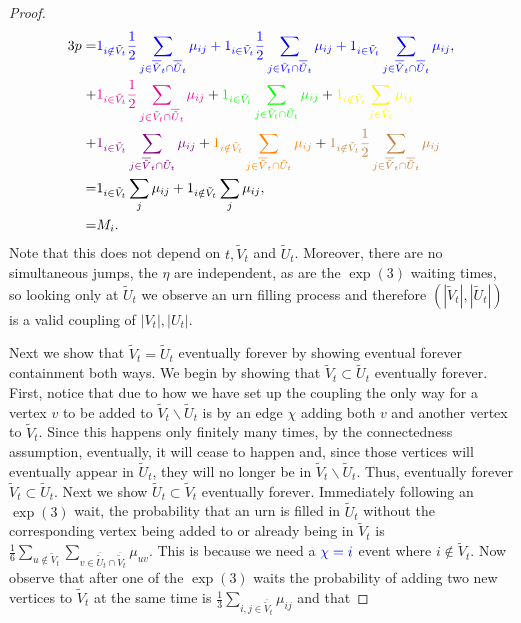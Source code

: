 \documentclass[12pt]{article}
\theoremstyle{definition}
\begin{document}
\begin{proof}
\begin{align*}
    3p = &\textcolor{blue}{1_{i \notin \tilde{V}_t}\frac{1}{2}\sum_{j \in \overline{\tilde{V}}_t \cap \overline{\tilde{U}}_t}\mu_{ij}+1_{i \in \tilde{V}_t}\frac{1}{2}\sum_{j \in \tilde{V}_t \cap \overline{\tilde{U}}_t}\mu_{ij}+1_{i \in \tilde{V}_t}\sum_{j \in \overline{\tilde{V}}_t \cap \overline{\tilde{U}}_t}\mu_{ij}}, \\
    +&\textcolor{magenta}{1_{i \in \tilde{V}_t}\frac{1}{2}\sum_{j \in \tilde{V}_t \cap \overline{\tilde{U}}_t}\mu_{ij}} + \textcolor{green}{1_{i \in \tilde{V}_t}\sum_{j \in \tilde{V}_t \cap \tilde{U}_t}\mu_{ij}}+\textcolor{yellow}{1_{i\notin \tilde{V}_t}\sum_{j \in \tilde{V}_t}\mu_{ij}}\\
    +&\textcolor{violet}{1_{i \in \tilde{V}_t} \sum_{j \in \overline{\tilde{V}}_t \cap \tilde{U}_t}\mu_{ij}} + \textcolor{orange}{1_{i \notin \tilde{V}_t}\sum_{j \in \overline{\tilde{V}}_t \cap \tilde{U}_t}\mu_{ij}}
    +\textcolor{brown}{1_{i \notin \tilde{V}_t}\frac{1}{2}\sum_{j \in \overline{\tilde{V}}_t \cap \overline{\tilde{U}}_t}\mu_{ij}} \\
    = &1_{i \in \tilde{V}_t}\sum_{j}\mu_{ij}+1_{i \notin \tilde{V}_t}\sum_{j}\mu_{ij}, \\
    = &M_i.
\end{align*} Note that this does not depend on $t,\tilde{V}_t$ and $\tilde{U}_t$. Moreover, there are no simultaneous jumps, the $\eta$ are independent, as are the $\exp(3)$ waiting times, so looking only at $\tilde{U}_t$ we observe an urn filling process and therefore $(|\tilde{V}_t|,|\tilde{U}_t|)$ is a valid coupling of $|V_t|,|U_t|$.


Next we show that $\tilde{V}_t = \tilde{U}_t$ eventually forever by showing eventual forever containment both ways. We begin by showing that $\tilde{V}_t \subset \tilde{U}_t$ eventually forever. First, notice that due to how we have set up the coupling the only way for a vertex $v$ to be added to $\tilde{V}_t \backslash \tilde{U}_t$ is by an edge $\chi$ adding both $v$ and another vertex to $\tilde{V}_t$. Since this happens only finitely many times, by the connectedness assumption, eventually, it will cease to happen and, since those vertices will eventually appear in $\tilde{U}_t$, they will no longer be in $\tilde{V}_t \backslash \tilde{U}_t$. Thus, eventually forever $\tilde{V}_t \subset  \tilde{U}_t$. Next we show $\tilde{U}_t \subset \tilde{V}_t$ eventually forever. Immediately following an $\exp(3)$ wait, the probability that an urn is filled in $\tilde{U}_t$ without the corresponding vertex being added to or already being in  $\tilde{V}_t$ is $\frac{1}{6}\sum_{u \notin \tilde{V}_t} \sum_{v \in \overline{\tilde{U}}_t \cap \overline{\tilde{V}}_t}\mu_{uv}$. This is because we need a $\textcolor{blue}{\chi = i}$ event where $i \notin \tilde{V}_t$. Now observe that after one of the $\exp(3)$ waits the probability of adding two new vertices to $\tilde{V}_t$ at the same time is $\frac{1}{3}\sum_{i,j \in \overline{\tilde{V}}_t}\mu_{ij}$ and that


\end{proof}
\end{document}
